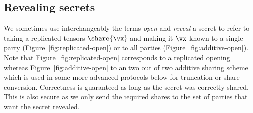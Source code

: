 \subsection{Revealing secrets}

We sometimes use interchangeably the terms \textit{open} and \textit{reveal} a secret to refer to taking a replicated tensors $\share{\vx}$ and making it $\vx$ known to a single party  (Figure~\ref{fig:replicated-open}) or to all parties (Figure~\ref{fig:additive-open}).
Note that Figure~\ref{fig:replicated-open} corresponds to a replicated opening whereas Figure~\ref{fig:additive-open} to an two out of two additive sharing scheme which is used in some more
advanced protocols below for truncation or share conversion. Correctness is guaranteed as long as
the secret was correctly shared. This is also secure as we only send the required
shares to the set of parties that want the secret revealed.

